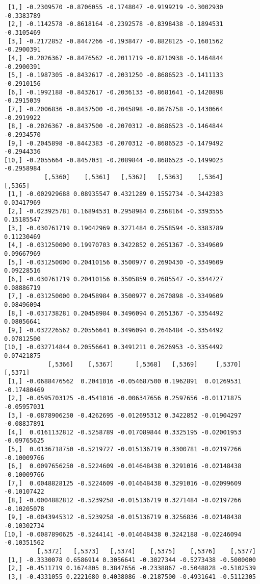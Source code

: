 \documentclass[
  letterpaper,
  DIV=11,
  numbers=noendperiod]{scrreprt}
\begin{document}
\begin{verbatim}
 [1,] -0.2309570 -0.8706055 -0.1748047 -0.9199219 -0.3002930 -0.3383789
 [2,] -0.1142578 -0.8618164 -0.2392578 -0.8398438 -0.1894531 -0.3105469
 [3,] -0.2172852 -0.8447266 -0.1938477 -0.8828125 -0.1601562 -0.2900391
 [4,] -0.2026367 -0.8476562 -0.2011719 -0.8710938 -0.1464844 -0.2900391
 [5,] -0.1987305 -0.8432617 -0.2031250 -0.8686523 -0.1411133 -0.2910156
 [6,] -0.1992188 -0.8432617 -0.2036133 -0.8681641 -0.1420898 -0.2915039
 [7,] -0.2006836 -0.8437500 -0.2045898 -0.8676758 -0.1430664 -0.2919922
 [8,] -0.2026367 -0.8437500 -0.2070312 -0.8686523 -0.1464844 -0.2934570
 [9,] -0.2045898 -0.8442383 -0.2070312 -0.8686523 -0.1479492 -0.2944336
[10,] -0.2055664 -0.8457031 -0.2089844 -0.8686523 -0.1499023 -0.2958984
           [,5360]    [,5361]   [,5362]   [,5363]    [,5364]    [,5365]
 [1,] -0.002929688 0.08935547 0.4321289 0.1552734 -0.3442383 0.03417969
 [2,] -0.023925781 0.16894531 0.2958984 0.2368164 -0.3393555 0.15185547
 [3,] -0.030761719 0.19042969 0.3271484 0.2558594 -0.3383789 0.11230469
 [4,] -0.031250000 0.19970703 0.3422852 0.2651367 -0.3349609 0.09667969
 [5,] -0.031250000 0.20410156 0.3500977 0.2690430 -0.3349609 0.09228516
 [6,] -0.030761719 0.20410156 0.3505859 0.2685547 -0.3344727 0.08886719
 [7,] -0.031250000 0.20458984 0.3500977 0.2670898 -0.3349609 0.08496094
 [8,] -0.031738281 0.20458984 0.3496094 0.2651367 -0.3354492 0.08056641
 [9,] -0.032226562 0.20556641 0.3496094 0.2646484 -0.3354492 0.07812500
[10,] -0.032714844 0.20556641 0.3491211 0.2626953 -0.3354492 0.07421875
            [,5366]    [,5367]      [,5368]   [,5369]     [,5370]     [,5371]
 [1,] -0.0688476562  0.2041016 -0.054687500 0.1962891  0.01269531 -0.17480469
 [2,] -0.0595703125 -0.4541016 -0.006347656 0.2597656 -0.01171875 -0.05957031
 [3,] -0.0878906250 -0.4262695 -0.012695312 0.3422852 -0.01904297 -0.08837891
 [4,]  0.0161132812 -0.5258789 -0.017089844 0.3325195 -0.02001953 -0.09765625
 [5,]  0.0136718750 -0.5219727 -0.015136719 0.3300781 -0.02197266 -0.10009766
 [6,]  0.0097656250 -0.5224609 -0.014648438 0.3291016 -0.02148438 -0.10009766
 [7,]  0.0048828125 -0.5224609 -0.014648438 0.3291016 -0.02099609 -0.10107422
 [8,] -0.0004882812 -0.5239258 -0.015136719 0.3271484 -0.02197266 -0.10205078
 [9,] -0.0043945312 -0.5239258 -0.015136719 0.3256836 -0.02148438 -0.10302734
[10,] -0.0087890625 -0.5244141 -0.014648438 0.3242188 -0.02246094 -0.10351562
         [,5372]   [,5373]   [,5374]    [,5375]    [,5376]    [,5377]
 [1,] -0.3330078 0.6586914 0.3056641 -0.3027344 -0.5273438 -0.5000000
 [2,] -0.4511719 0.1674805 0.3847656 -0.2338867 -0.5048828 -0.5102539
 [3,] -0.4331055 0.2221680 0.4038086 -0.2187500 -0.4931641 -0.5112305

\end{verbatim}
\end{document}
